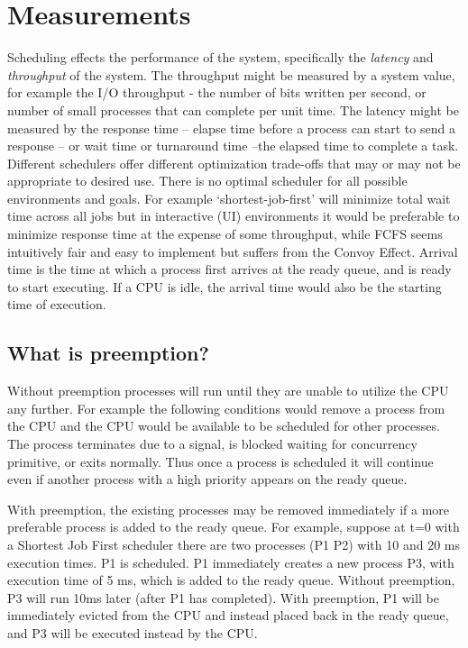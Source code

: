 \section{Measurements}

Scheduling effects the performance of the system, specifically the \emph{latency} and \emph{throughput} of the system.
The throughput might be measured by a system value, for example the I/O throughput - the number of bits written per second, or number of small processes that can complete per unit time.
The latency might be measured by the response time -- elapse time before a process can start to send a response -- or wait time or turnaround time --the elapsed time to complete a task.
Different schedulers offer different optimization trade-offs that may or may not be appropriate to desired use.
There is no optimal scheduler for all possible environments and goals.
For example `shortest-job-first' will minimize total wait time across all jobs but in interactive (UI) environments it would be preferable to minimize response time at the expense of some throughput, while FCFS seems intuitively fair and easy to implement but suffers from the Convoy Effect.
Arrival time is the time at which a process first arrives at the ready queue, and is ready to start executing.
If a CPU is idle, the arrival time would also be the starting time of execution.

\subsection{What is preemption?}

Without preemption processes will run until they are unable to utilize the CPU any further.
For example the following conditions would remove a process from the CPU and the CPU would be available to be scheduled for other processes.
The process terminates due to a signal, is blocked waiting for concurrency primitive, or exits normally.
Thus once a process is scheduled it will continue even if another process with a high priority appears on the ready queue.

With preemption, the existing processes may be removed immediately if a more preferable process is added to the ready queue.
For example, suppose at t=0 with a Shortest Job First scheduler there are two processes (P1 P2) with 10 and 20 ms execution times.
P1 is scheduled.
P1 immediately creates a new process P3, with execution time of 5 ms, which is added to the ready queue.
Without preemption, P3 will run 10ms later (after P1 has completed).
With preemption, P1 will be immediately evicted from the CPU and instead placed back in the ready queue, and P3 will be executed instead by the CPU.

